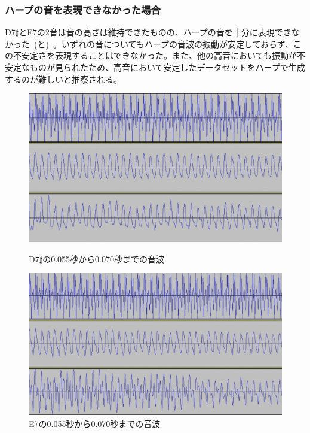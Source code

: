 \clearpage

\subsubsection{ハープの音を表現できなかった場合}

D7$\sharp$とE7の2音は音の高さは維持できたものの、ハープの音を十分に表現できなかった~(と)~。いずれの音についてもハープの音波の振動が安定しておらず、この不安定さを表現することはできなかった。また、他の高音においても振動が不安定なものが見られたため、高音において安定したデータセットをハープで生成するのが難しいと推察される。

\begin{figure}[b]
\centering
\begin{minipage}{0.48\columnwidth}
\centering
\includegraphics[width=0.9\columnwidth]{figure/88_88_det/d7s_0550_0700.png}
\caption[D7$\sharp$の音波]{D7$\sharp$の0.055秒から0.070秒までの音波}
\label{fig:88_88_bad1}
\end{minipage}
\begin{minipage}{0.48\columnwidth}
\centering
\includegraphics[width=0.9\columnwidth]{figure/88_88_det/e7_0550_0700.png}
\caption[E7の音波]{E7の0.055秒から0.070秒までの音波}
\label{fig:88_88_bad2}
\end{minipage}
\end{figure}

